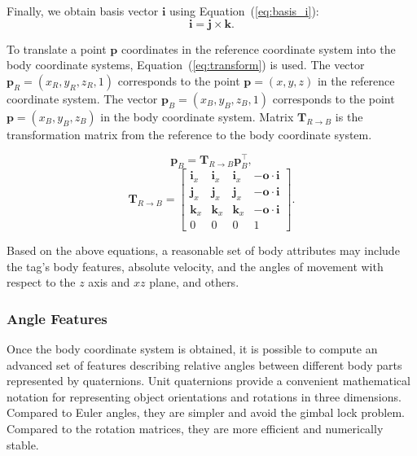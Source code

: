 Finally, we obtain basis vector $\mathbf{i}$ using Equation~(\ref{eq:basis_i}):
\begin{equation}
\label{eq:basis_i}
	\mathbf{i}=\mathbf{j} \times \mathbf{k}.
\end{equation} 

	 
To translate a point $\mathbf{p}$ coordinates in the reference coordinate system into the body coordinate systems, Equation~(\ref{eq:transform}) is used. The vector $\mathbf{p}_R = (x_R, y_R, z_R, 1)$ corresponds to the point $\mathbf{p} = (x, y, z)$ in the reference coordinate system. The vector $\mathbf{p}_B = (x_B, y_B, z_B, 1)$ corresponds to the point $\mathbf{p}=(x_B, y_B, z_B)$ in the body coordinate system. Matrix $\mathbf{T}_{R \rightarrow B}$ is the transformation matrix from the reference to the body coordinate system. 

\begin{equation}
\label{eq:transform}
\mathbf{p}_B=\mathbf{T}_{R \rightarrow B} \mathbf{p}_B^\intercal,
\end{equation} 
$$
 \mathbf{T}_{R \rightarrow B} = \begin{bmatrix}
        \mathbf{i}_x &	\mathbf{i}_x &	\mathbf{i}_x &	-\mathbf{o} \cdot \mathbf{i} \\
        \mathbf{j}_x &	\mathbf{j}_x &	\mathbf{j}_x &	-\mathbf{o} \cdot \mathbf{i} \\
        \mathbf{k}_x &	\mathbf{k}_x &	\mathbf{k}_x &	-\mathbf{o} \cdot \mathbf{i} \\
        0 &	 			0 &				0 &				1
      \end{bmatrix}.
$$

Based on the above equations, a reasonable set of body attributes may include the tag's body features, absolute velocity, and the angles of movement with respect to the $z$ axis and $xz$ plane, and others.

\subsubsection{Angle Features}	

Once the body coordinate system is obtained, it is possible to compute an advanced set of features describing relative angles between different body parts represented by quaternions. Unit quaternions provide a convenient mathematical notation for representing object orientations and rotations in three dimensions. Compared to Euler angles, they are simpler and avoid the gimbal lock problem. Compared to the rotation matrices, they are more efficient and numerically stable. %

